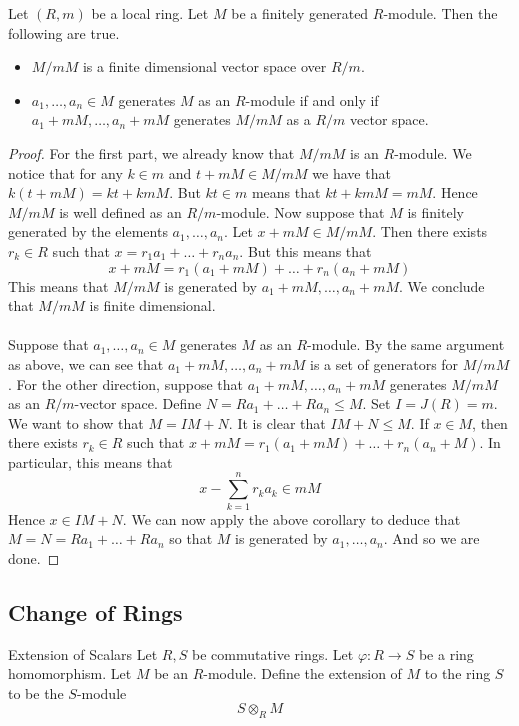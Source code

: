 \documentclass[a4paper]{article}
\begin{document}
\begin{crl}{}{} Let $(R,m)$ be a local ring. Let $M$ be a finitely generated $R$-module. Then the following are true. 
\begin{itemize}
\item $M/mM$ is a finite dimensional vector space over $R/m$. 
\item $a_1,\dots,a_n\in M$ generates $M$ as an $R$-module if and only if $a_1+mM,\dots,a_n+mM$ generates $M/mM$ as a $R/m$ vector space. 
\end{itemize} \tcbline
\begin{proof}
For the first part, we already know that $M/mM$ is an $R$-module. We notice that for any $k\in m$ and $t+mM\in M/mM$ we have that $k(t+mM)=kt+kmM$. But $kt\in m$ means that $kt+kmM=mM$. Hence $M/mM$ is well defined as an $R/m$-module. Now suppose that $M$ is finitely generated by the elements $a_1,\dots,a_n$. Let $x+mM\in M/mM$. Then there exists $r_k\in R$ such that $x=r_1a_1+\dots+r_na_n$. But this means that $$x+mM=r_1(a_1+mM)+\dots+r_n(a_n+mM)$$ This means that $M/mM$ is generated by $a_1+mM,\dots,a_n+mM$. We conclude that $M/mM$ is finite dimensional. \\~\\

Suppose that $a_1,\dots,a_n\in M$ generates $M$ as an $R$-module. By the same argument as above, we can see that $a_1+mM,\dots,a_n+mM$ is a set of generators for $M/mM$. For the other direction, suppose that $a_1+mM,\dots,a_n+mM$ generates $M/mM$ as an $R/m$-vector space. Define $N=Ra_1+\dots+Ra_n\leq M$. Set $I=J(R)=m$. We want to show that $M=IM+N$. It is clear that $IM+N\leq M$. If $x\in M$, then there exists $r_k\in R$ such that $x+mM=r_1(a_1+mM)+\dots+r_n(a_n+M)$. In particular, this means that $$x-\sum_{k=1}^nr_ka_k\in mM$$ Hence $x\in IM+N$. We can now apply the above corollary to deduce that $M=N=Ra_1+\dots+Ra_n$ so that $M$ is generated by $a_1,\dots,a_n$. And so we are done. 
\end{proof}
\end{crl}

\subsection{Change of Rings}
\begin{defn}{Extension of Scalars}{} Let $R,S$ be commutative rings. Let $\varphi:R\to S$ be a ring homomorphism. Let $M$ be an $R$-module. Define the extension of $M$ to the ring $S$ to be the $S$-module $$S\otimes_R M$$
\end{defn}
\end{document}
